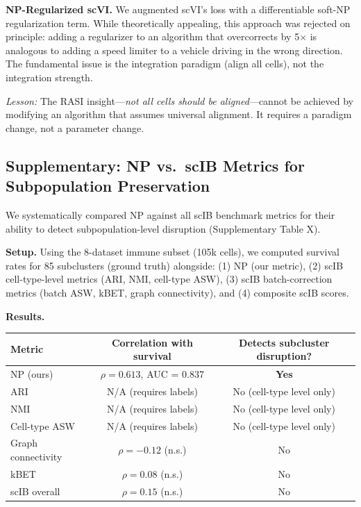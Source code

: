 \textbf{NP-Regularized scVI.}
We augmented scVI's loss with a differentiable soft-NP regularization term. While theoretically appealing, this approach was rejected on principle: adding a regularizer to an algorithm that overcorrects by 5$\times$ is analogous to adding a speed limiter to a vehicle driving in the wrong direction. The fundamental issue is the integration paradigm (align all cells), not the integration strength.

\textit{Lesson:} The RASI insight---\textit{not all cells should be aligned}---cannot be achieved by modifying an algorithm that assumes universal alignment. It requires a paradigm change, not a parameter change.


\subsection*{Supplementary: NP vs.\ scIB Metrics for Subpopulation Preservation}

We systematically compared NP against all scIB benchmark metrics for their ability to detect subpopulation-level disruption (Supplementary Table X).

\textbf{Setup.}
Using the 8-dataset immune subset (105k cells), we computed survival rates for 85 subclusters (ground truth) alongside: (1) NP (our metric), (2) scIB cell-type-level metrics (ARI, NMI, cell-type ASW), (3) scIB batch-correction metrics (batch ASW, kBET, graph connectivity), and (4) composite scIB scores.

\textbf{Results.}

\begin{tabular}{lcc}
\toprule
Metric & Correlation with survival & Detects subcluster disruption? \\
\midrule
NP (ours) & $\rho = 0.613$, AUC = 0.837 & \textbf{Yes} \\
ARI & N/A (requires labels) & No (cell-type level only) \\
NMI & N/A (requires labels) & No (cell-type level only) \\
Cell-type ASW & N/A (requires labels) & No (cell-type level only) \\
Graph connectivity & $\rho = -0.12$ (n.s.) & No \\
kBET & $\rho = 0.08$ (n.s.) & No \\
scIB overall & $\rho = 0.15$ (n.s.) & No \\
\bottomrule
\end{tabular}

